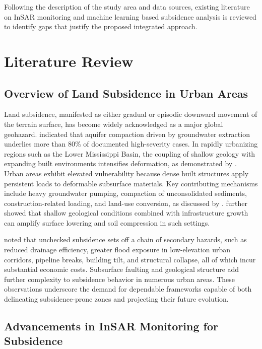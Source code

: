 \documentclass[oneside,doublespacing,flushright]{lsuthesis}
\begin{document}
Following the description of the study area and data sources, existing literature on InSAR monitoring and machine learning based subsidence analysis is reviewed to identify gaps that justify the proposed integrated approach.

\chapter{Literature Review}

\section{Overview of Land Subsidence in Urban Areas}

Land subsidence, manifested as either gradual or episodic downward movement of the terrain surface, has become widely acknowledged as a major global geohazard. \citet{Higgins2016} indicated that aquifer compaction driven by groundwater extraction underlies more than 80\% of documented high-severity cases. In rapidly urbanizing regions such as the Lower Mississippi Basin, the coupling of shallow geology with expanding built environments intensifies deformation, as demonstrated by \citet{HosseinzadehLLand2024}.
Urban areas exhibit elevated vulnerability because dense built structures apply persistent loads to deformable subsurface materials. Key contributing mechanisms include heavy groundwater pumping, compaction of unconsolidated sediments, construction-related loading, and land-use conversion, as discussed by \citet{Holzer1985}. \citet{Zou2016} further showed that shallow geological conditions combined with infrastructure growth can amplify surface lowering and soil compression in such settings.

\citet{Higgins2016} noted that unchecked subsidence sets off a chain of secondary hazards, such as reduced drainage efficiency, greater flood exposure in low-elevation urban corridors, pipeline breaks, building tilt, and structural collapse, 
all of which incur substantial economic costs. Subsurface faulting and geological structure add further complexity to subsidence behavior in numerous urban areas.
These observations underscore the demand for dependable frameworks capable of both delineating subsidence-prone zones and projecting their future evolution.

\section{Advancements in InSAR Monitoring for Subsidence}
\end{document}
